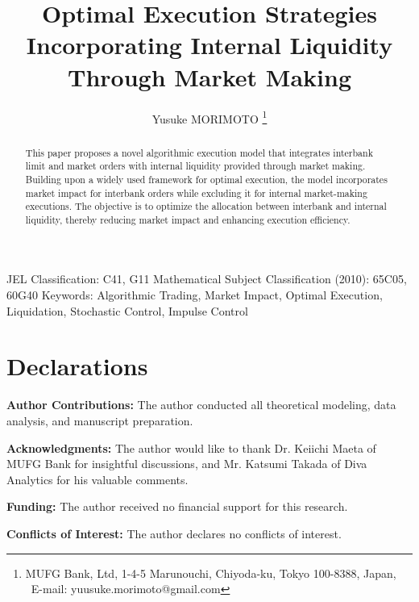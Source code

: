 \documentclass[12pt]{article}
\begin{document}
\title{Optimal Execution Strategies Incorporating Internal Liquidity Through Market Making}

\author{
Yusuke MORIMOTO
\thanks{
MUFG Bank, Ltd, 1-4-5 Marunouchi, Chiyoda-ku, Tokyo 100-8388, Japan, \
E-mail: yuusuke.morimoto@gmail.com} }
\date{}
\maketitle
\begin{abstract}
This paper proposes a novel algorithmic execution model that integrates interbank limit and market orders with internal liquidity provided through market making. 
Building upon a widely used framework for optimal execution, the model incorporates market impact for interbank orders while excluding it for internal market-making executions. The objective is to optimize the allocation between interbank and internal liquidity, thereby reducing market impact and enhancing execution efficiency.
\end{abstract}

JEL Classification: C41, G11
Mathematical Subject Classification (2010): 65C05, 60G40
Keywords: Algorithmic Trading, Market Impact, Optimal Execution, Liquidation, Stochastic Control, Impulse Control

\section*{Declarations}

\textbf{Author Contributions:} The author conducted all theoretical modeling, data analysis, and manuscript preparation.

\textbf{Acknowledgments:}  The author would like to thank Dr. Keiichi Maeta of MUFG Bank for insightful discussions, and Mr. Katsumi Takada of Diva Analytics for his valuable comments.


\textbf{Funding:} The author received no financial support for this research.

\textbf{Conflicts of Interest:} The author declares no conflicts of interest.
\end{document}
